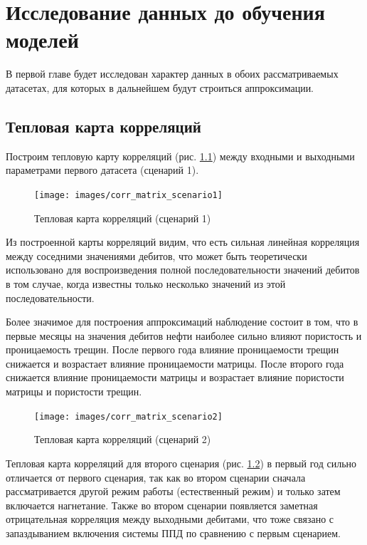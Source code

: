 
\chapter{Исследование данных до обучения моделей} \label{ch1}
В первой главе будет исследован характер данных в обоих рассматриваемых датасетах, для которых в дальнейшем будут строиться аппроксимации.
\section{Тепловая карта корреляций} \label{ch1:sec1}
Построим тепловую карту корреляций (рис. \ref{fig:heat-map-1}) между входными и выходными параметрами первого датасета (сценарий 1).

\begin{figure}[H] 
	\center
	\texttt{[image: images/corr\_matrix\_scenario1]}
	\caption{Тепловая карта корреляций (сценарий 1)} 
	\label{fig:heat-map-1}
\end{figure}
Из построенной карты корреляций видим, что есть сильная линейная корреляция между соседними значениями дебитов, что может быть теоретически использовано для воспроизведения полной последовательности значений дебитов в том случае, когда известны только несколько значений из этой последовательности. 

Более значимое для построения аппроксимаций наблюдение состоит в том, что в первые месяцы на значения дебитов нефти наиболее сильно влияют пористость и проницаемость трещин. После первого года влияние проницаемости трещин снижается и возрастает влияние проницаемости матрицы. После второго года снижается влияние проницаемости матрицы и возрастает влияние пористости матрицы и пористости трещин.

\begin{figure}[H] 
	\center
	\texttt{[image: images/corr\_matrix\_scenario2]}
	\caption{Тепловая карта корреляций (сценарий 2)} 
	\label{fig:heat-map-2}
\end{figure}

Тепловая карта корреляций для второго сценария (рис. \ref{fig:heat-map-2}) в первый год сильно отличается от первого сценария, так как во втором сценарии сначала рассматривается другой режим работы (естественный режим) и только затем включается нагнетание. Также во втором сценарии появляется заметная отрицательная корреляция между выходными дебитами, что тоже связано с запаздыванием включения системы ППД по сравнению с первым сценарием.


